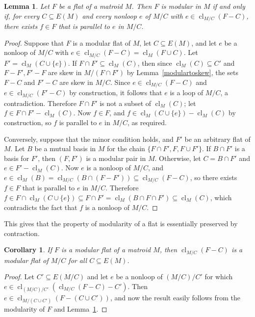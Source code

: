 \documentclass{amsart}
\theoremstyle{plain}
\newtheorem{lemma}[theorem]{Lemma}
\newtheorem{corollary}[theorem]{Corollary}
\theoremstyle{definition}
\DeclareMathOperator{\cl}{cl}
\newcommand{\con}{/}
\renewcommand{\ss}{\subseteq}
\begin{document}
\begin{lemma}\label{contractonto}
  Let $F$ be a flat of a matroid $M$. Then $F$ is modular in $M$ if and only if, 
  for every $C \subseteq E(M)$ and every nonloop $e$ of $M \con C$ with $e \in \cl_{M \con C}(F-C)$, 
  there exists $f \in F$ that is parallel to $e$ in $M \con C$. 
\end{lemma}
\begin{proof}
  Suppose that $F$ is a modular flat of $M$, let $C \subseteq E(M)$,
  and let $e$ be a nonloop of $M \con C$ with $e \in \cl_{M \con C}(F - C) = \cl_M(F \cup C)$. 
  Let $F' = \cl_M(C \cup \{e\})$.
  If $F \cap F' \ss \cl_M(C)$, then since $\cl_M(C) \ss C'$ and $F - F', F' - F$ 
  are skew in $M \con (F \cap F')$ by Lemma~\ref{modulartoskew}, 
  the sets $F - C$ and $F' - C$ are skew in $M \con C$.
  Since $e \in \cl_{M \con C}(F-C)$ and $e \in \cl_{M \con C}(F' - C)$ by construction, 
  it follows that $e$ is a loop of $M \con C$, a contradiction. 
  Therefore $F \cap F'$ is not a subset of $\cl_M(C)$; let $f \in F \cap F' - \cl_M(C)$. 
  Now $f \in F$, and $f \in \cl_M(C \cup \{e\}) - \cl_M(C)$ by construction, 
  so $f$ is parallel to $e$ in $M \con C$, as required. 

  Conversely, suppose that the minor condition holds, and $F'$ be an arbitrary flat of $M$. 
  Let $B$ be a mutual basis in $M$ for the chain $\{F \cap F', F, F \cup F'\}$.
  If $B \cap F'$ is a basis for $F'$, then $(F, F')$ is a modular pair in $M$. 
  Otherwise, let $C = B \cap F'$ and $e \in F' - \cl_M(C)$. 
  Now $e$ is a nonloop of $M \con C$, 
  and $e \in \cl_M(B) = \cl_{M \con C}(B \cap (F - F')) \ss \cl_{M \con C}(F - C)$, 
  so there exists $f \in F$ that is parallel to $e$ in $M \con C$. 
  Therefore $f \in F \cap \cl_M(C \cup \{e\}) \ss F \cap F' = \cl_M(B \cap F \cap F') \ss \cl_M(C)$, 
  which contradicts the fact that $f$ is a nonloop of $M \con C$. 
\end{proof}

This gives that the property of modularity of a flat is essentially preserved by contraction. 

\begin{corollary}\label{modularcontract}
  If $F$ is a modular flat of a matroid $M$, 
  then $\cl_{M \con C}(F - C)$ is a modular flat of $M \con C$ for all $C \subseteq E(M)$. 
\end{corollary}
\begin{proof}
  Let $C' \ss E(M \con C)$ and let $e$ be a nonloop of $(M \con C) \con C'$
  for which $e \in \cl_{(M \con C) \con C'}(\cl_{M \con C}(F-C) - C')$. 
  Then $e \in \cl_{M \con (C \cup C')}(F - (C \cup C'))$, 
  and now the result easily follows from the modularity of $F$ and Lemma~\ref{contractonto}.
\end{proof}
\end{document}
